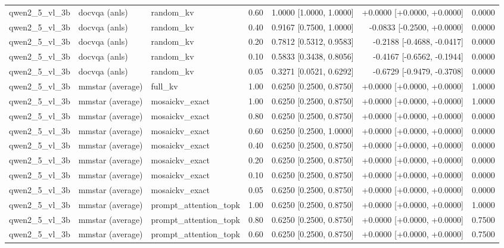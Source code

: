 \begin{longtable}{lllrrrr}
qwen2\_5\_vl\_3b & docvqa (anls) & random\_kv & 0.60 & 1.0000 [1.0000, 1.0000] & +0.0000 [+0.0000, +0.0000] & 0.0000 \\
qwen2\_5\_vl\_3b & docvqa (anls) & random\_kv & 0.40 & 0.9167 [0.7500, 1.0000] & -0.0833 [-0.2500, +0.0000] & 0.0000 \\
qwen2\_5\_vl\_3b & docvqa (anls) & random\_kv & 0.20 & 0.7812 [0.5312, 0.9583] & -0.2188 [-0.4688, -0.0417] & 0.0000 \\
qwen2\_5\_vl\_3b & docvqa (anls) & random\_kv & 0.10 & 0.5833 [0.3438, 0.8056] & -0.4167 [-0.6562, -0.1944] & 0.0000 \\
qwen2\_5\_vl\_3b & docvqa (anls) & random\_kv & 0.05 & 0.3271 [0.0521, 0.6292] & -0.6729 [-0.9479, -0.3708] & 0.0000 \\
qwen2\_5\_vl\_3b & mmstar (average) & full\_kv & 1.00 & 0.6250 [0.2500, 0.8750] & +0.0000 [+0.0000, +0.0000] & 1.0000 \\
qwen2\_5\_vl\_3b & mmstar (average) & mosaickv\_exact & 1.00 & 0.6250 [0.2500, 0.8750] & +0.0000 [+0.0000, +0.0000] & 1.0000 \\
qwen2\_5\_vl\_3b & mmstar (average) & mosaickv\_exact & 0.80 & 0.6250 [0.2500, 0.8750] & +0.0000 [+0.0000, +0.0000] & 0.0000 \\
qwen2\_5\_vl\_3b & mmstar (average) & mosaickv\_exact & 0.60 & 0.6250 [0.2500, 1.0000] & +0.0000 [+0.0000, +0.0000] & 0.0000 \\
qwen2\_5\_vl\_3b & mmstar (average) & mosaickv\_exact & 0.40 & 0.6250 [0.2500, 0.8750] & +0.0000 [+0.0000, +0.0000] & 0.0000 \\
qwen2\_5\_vl\_3b & mmstar (average) & mosaickv\_exact & 0.20 & 0.6250 [0.2500, 0.8750] & +0.0000 [+0.0000, +0.0000] & 0.0000 \\
qwen2\_5\_vl\_3b & mmstar (average) & mosaickv\_exact & 0.10 & 0.6250 [0.2500, 0.8750] & +0.0000 [+0.0000, +0.0000] & 0.0000 \\
qwen2\_5\_vl\_3b & mmstar (average) & mosaickv\_exact & 0.05 & 0.6250 [0.2500, 0.8750] & +0.0000 [+0.0000, +0.0000] & 0.0000 \\
qwen2\_5\_vl\_3b & mmstar (average) & prompt\_attention\_topk & 1.00 & 0.6250 [0.2500, 0.8750] & +0.0000 [+0.0000, +0.0000] & 1.0000 \\
qwen2\_5\_vl\_3b & mmstar (average) & prompt\_attention\_topk & 0.80 & 0.6250 [0.2500, 0.8750] & +0.0000 [+0.0000, +0.0000] & 0.7500 \\
qwen2\_5\_vl\_3b & mmstar (average) & prompt\_attention\_topk & 0.60 & 0.6250 [0.2500, 0.8750] & +0.0000 [+0.0000, +0.0000] & 0.7500 \\

\end{longtable}
